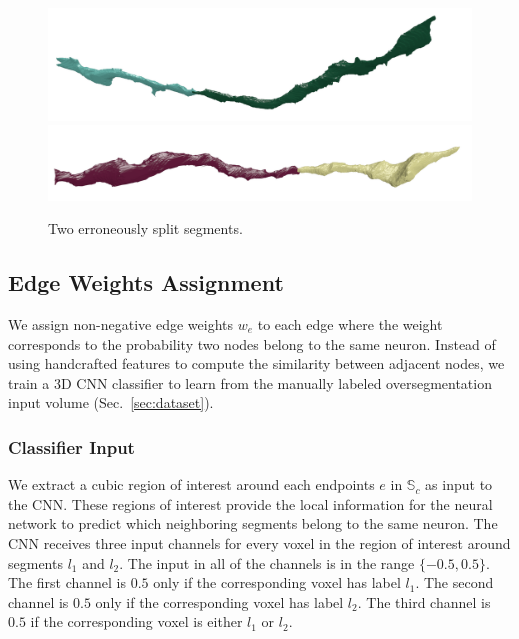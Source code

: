\begin{figure}[t]
	\centering
	\includegraphics[width=0.92\linewidth]{./figures/split_error1.png}
	\includegraphics[width=0.92\linewidth]{./figures/split_error2.png}
	\caption{Two erroneously split segments. }
	\label{fig:merge_candidates}
\end{figure}

\subsection{Edge Weights Assignment}
We assign non-negative edge weights $w_e$ to each edge where the weight corresponds to the probability two nodes belong to the same neuron.
Instead of using handcrafted features to compute the similarity between adjacent nodes, we train a 3D CNN classifier to learn from the manually labeled oversegmentation input volume (Sec.~\ref{sec:dataset}).

\subsubsection{Classifier Input}

We extract a cubic region of interest around each endpoints $e$ in $\mathbb{S}_c$ as input to the CNN. These regions of interest provide the local information for the neural network to predict which neighboring segments belong to the same neuron. The CNN receives three input channels for every voxel in the region of interest around segments $l_1$ and $l_2$. The input in all of the channels is in the range $\{-0.5, 0.5\}$. The first channel is $0.5$ only if the corresponding voxel has label $l_1$. The second channel is $0.5$ only if the corresponding voxel has label $l_2$. The third channel is $0.5$ if the corresponding voxel is either $l_1$ or $l_2$.

